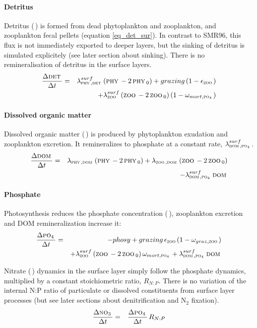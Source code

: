\documentclass[11pt,a4paper,fleqn,twoside]{article}
\def\pho{\text{\textsc{po$_4$}}\,}
\def\nit{\text{\textsc{no$_3$}}\,}
\def\dom{\text{\textsc{dom}}\,}
\def\phy{\text{\textsc{phy}}\,}
\def\zoo{\text{\textsc{zoo}}\,}
\def\det{\text{\textsc{det}}\,}
\begin{document}
\paragraph{Detritus} Detritus (\det) is formed from dead phytoplankton and
zooplankton, and zooplankton fecal pellets (equation \ref{eq_det_sur}). In
contrast to SMR96, this flux is not immediately exported to deeper layers, but
the sinking of detritus is simulated explicitely (see later section about sinking).
There is no remineralisation of detritus in the surface layers.
\begin{eqnarray}
\label{eq_det_sur}
\frac{\Delta \det}{\Delta t} & = & \lambda_{\phy,\det}^{surf} \left( \phy - 2 \,\phy_0 \right)
+grazing \, (1-\epsilon_{\zoo}) \\ \nonumber
& & + \lambda_{\zoo}^{surf} \left( \zoo - 2\,\zoo_0 \right)
(1-\omega_{mort,\pho})
\end{eqnarray}

\paragraph{Dissolved organic matter} Dissolved organic matter (\dom) is produced
by phytoplankton exudation and  zooplankton excretion. It remineralizes to 
phosphate at a constant rate, $\lambda_{\dom,\pho}^{surf}$.
\begin{eqnarray} \label{eq_dom_sur} \frac{\Delta \dom}{\Delta t} & = &
\lambda_{\phy,\dom} \left( \phy - 2 \,\phy_0 \right) +\lambda_{\zoo,\dom}
\left( \zoo - 2\,\zoo_0 \right) \\ \nonumber & & - \lambda_{\dom,\pho}^{surf}
\, \dom \end{eqnarray}

\paragraph{Phosphate} Photosynthesis reduces the phosphate concentration (\pho), 
zooplankton excretion and DOM remineralization increase it:
\begin{eqnarray}
\label{eq_pho_sur}
\frac{\Delta \pho}{\Delta t} & = & - phosy + grazing \, \epsilon_{\zoo} 
(1-\omega_{graz,\zoo}) \\ \nonumber
& & + \lambda_{\zoo}^{surf} \left( \zoo - 2\,\zoo_0 \right) \omega_{mort,\pho}
+ \lambda_{\dom,\pho}^{surf} \, \dom
\end{eqnarray}

Nitrate (\nit) dynamics in the surface layer 
simply follow the phosphate dynamics, multiplied by a constant
stoichiometric ratio, $R_{N:P}$. There is no variation of the internal N:P
ratio of particulate or dissolved constituents from  surface layer processes
(but see later sections about denitrification and N$_2$ fixation).
\begin{eqnarray}
\label{eq_nit_sur}
\frac{\Delta \nit}{\Delta t} & = & \frac{\Delta \pho}{\Delta t} \, R_{N:P} 
\end{eqnarray}
\end{document}
